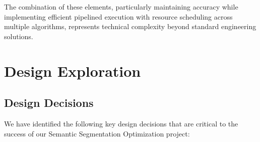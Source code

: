 The combination of these elements, particularly maintaining accuracy while implementing efficient pipelined execution with resource scheduling across multiple algorithms, represents technical complexity beyond standard engineering solutions.

\section{Design Exploration}\label{sec:design-exploration}

\subsection{Design Decisions}\label{subsec:design-decisions}

We have identified the following key design decisions that are critical to the success of our Semantic Segmentation Optimization project:

